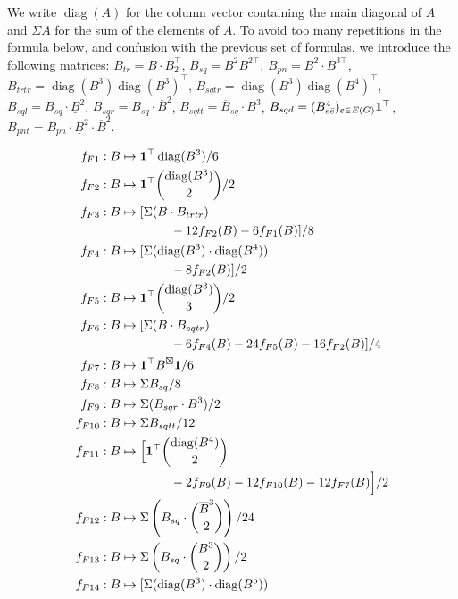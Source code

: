 \documentclass{article}
\theoremstyle{plain}
\DeclareMathOperator{\diag}{diag}
\begin{document}
We write $\diag(A)$ for the column vector containing the main diagonal of $A$ and $\Sigma A$ for the sum of the elements of $A$. To avoid too many repetitions in the formula below, and confusion with the previous set of formulas, we introduce the following matrices: $B_{tr}=B\cdot B_2^\top$, $B_{sq}= B^2B^{2\top}$, $B_{pn} = B^2\cdot B^{3\top}$, $B_{trtr} = \diag(B^3)\diag(B^3)^\top$, $B_{sqtr} = \diag(B^3)\diag(B^4)^\top$, $B_{sql} = B_{sq}\cdot \underline B^2$, $B_{sqr} = B_{sq}\cdot \overline B^2$, $B_{sqtt} = \overline B_{sq}\cdot B^3$, $B_{sqd} = (B^4_{e\bar e})_{e\in E(G)}{\bf 1}^\top$, $B_{pnt} = B_{pn}\cdot \underline B^2\cdot  \overline B^2$.

\begin{align*}
        f_{F1} : B&\mapsto {\bf 1}^\top \diag(B^3)/6\\
        f_{F2} : B&\mapsto {\bf 1}^\top\binom{\diag(B^3)}{2}/2\\
        f_{F3} : B&\mapsto [\Sigma(B\cdot B_{trtr})\\
                                &\qquad\qquad-12f_{F2}(B)-6f_{F1}(B)]/8\\
        f_{F4} : B&\mapsto [\Sigma(\diag(B^3)\cdot \diag(B^4))\\
                                &\qquad\qquad-8f_{F2}(B)]/2\\
        f_{F5} : B&\mapsto {\bf 1}^\top\binom{\diag(B^3)}{3}/2\\
        f_{F6} : B&\mapsto [\Sigma(B\cdot B_{sqtr})\\
                                &\qquad\qquad-6f_{F4}(B)-24f_{F5}(B)-16f_{F2}(B)]/4\\
        f_{F7} : B&\mapsto {\bf 1}^\top B^\boxtimes{\bf 1}/6\\
        f_{F8} : B&\mapsto \Sigma B_{sq}/8\\
        f_{F9} : B&\mapsto \Sigma(B_{sqr}\cdot B^3)/2\\
        f_{F10} : B&\mapsto \Sigma B_{sqtt}/12\\
        f_{F11} : B&\mapsto \Big[{\bf 1}^\top\binom{\diag(B^4)}{2}\\
                                &\qquad\qquad-2f_{F9}(B)-12f_{F10}(B)-12f_{F7}(B)\Big]/2\\
        f_{F12} : B&\mapsto \Sigma\left(B_{sq}\cdot \binom{\overline B^3}{2}\right)/24\\
        f_{F13} : B&\mapsto \Sigma\left(B_{sq}\cdot \binom{B^3}{2}\right)/2\\
        f_{F14} : B&\mapsto [\Sigma(\diag(B^3)\cdot \diag(B^5))\\

\end{align*}
\end{document}
